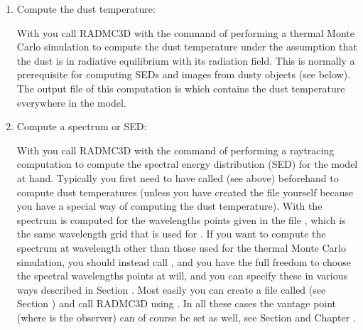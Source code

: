 \documentclass[letterpaper,10pt,english]{sphinxmanual}
\begin{document}
\begin{enumerate}
%
\item {} 
Compute the dust temperature:

With  you call RADMC\sphinxhyphen{}3D with the command of performing a
thermal Monte Carlo simulation to compute the dust temperature under the
assumption that the dust is in radiative equilibrium with its radiation
field. This is normally a prerequisite for computing SEDs and images from
dusty objects (see  below).  The output file of
this computation is  which contains the dust
temperature everywhere in the model.

\item {} 
Compute a spectrum or SED:

With  you call RADMC\sphinxhyphen{}3D with the command of performing a
ray\sphinxhyphen{}tracing computation to compute the spectral energy distribution (SED) for
the model at hand. Typically you first need to have called  (see above) beforehand to compute dust temperatures (unless you
have created the file  yourself because you have a
special way of computing the dust temperature). With  the
spectrum is computed for the wavelengths points given in the file
, which is the same wavelength grid that is used for
. If you want to compute the spectrum at wavelength other
than those used for the thermal Monte Carlo simulation, you should instead
call , and you have the full freedom to choose the
spectral wavelengths points at will, and you can specify these in various
ways described in Section {\hyperref[\detokenize{imagesspectra:sec-set-camera-frequencies}]{}}.  Most easily you
can create a file called  (see Section
{\hyperref[\detokenize{inputoutputfiles:sec-camera-wavelengths}]{}}) and call RADMC\sphinxhyphen{}3D using . In all these cases the vantage point (where is the observer)
can of course be set as well, see Section {\hyperref[\detokenize{dustradtrans:sec-dust-ray-tracing}]{}} and
Chapter {\hyperref[\detokenize{imagesspectra:chap-images-spectra}]{}}.


\end{enumerate}
\end{document}
